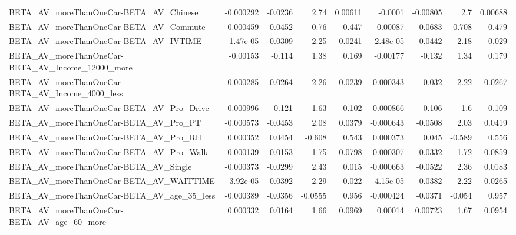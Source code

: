 \begin{tabular}{lrrrrrrrr}
BETA\_AV\_moreThanOneCar-BETA\_AV\_Chinese             &   -0.000292 &      -0.0236 &      2.74 &  0.00611 &    -0.0001 &    -0.00805 &          2.7 &       0.00688 \\
BETA\_AV\_moreThanOneCar-BETA\_AV\_Commute             &   -0.000459 &      -0.0452 &     -0.76 &    0.447 &   -0.00087 &     -0.0683 &       -0.708 &         0.479 \\
BETA\_AV\_moreThanOneCar-BETA\_AV\_IVTIME              &   -1.47e-05 &      -0.0309 &      2.25 &   0.0241 &  -2.48e-05 &     -0.0442 &         2.18 &         0.029 \\
BETA\_AV\_moreThanOneCar-BETA\_AV\_Income\_12000\_more   &    -0.00153 &       -0.114 &      1.38 &    0.169 &   -0.00177 &      -0.132 &         1.34 &         0.179 \\
BETA\_AV\_moreThanOneCar-BETA\_AV\_Income\_4000\_less    &    0.000285 &       0.0264 &      2.26 &   0.0239 &   0.000343 &       0.032 &         2.22 &        0.0267 \\
BETA\_AV\_moreThanOneCar-BETA\_AV\_Pro\_Drive           &   -0.000996 &       -0.121 &      1.63 &    0.102 &  -0.000866 &      -0.106 &          1.6 &         0.109 \\
BETA\_AV\_moreThanOneCar-BETA\_AV\_Pro\_PT              &   -0.000573 &      -0.0453 &      2.08 &   0.0379 &  -0.000643 &     -0.0508 &         2.03 &        0.0419 \\
BETA\_AV\_moreThanOneCar-BETA\_AV\_Pro\_RH              &    0.000352 &       0.0454 &    -0.608 &    0.543 &   0.000373 &       0.045 &       -0.589 &         0.556 \\
BETA\_AV\_moreThanOneCar-BETA\_AV\_Pro\_Walk            &    0.000139 &       0.0153 &      1.75 &   0.0798 &   0.000307 &      0.0332 &         1.72 &        0.0859 \\
BETA\_AV\_moreThanOneCar-BETA\_AV\_Single              &   -0.000373 &      -0.0299 &      2.43 &    0.015 &  -0.000663 &     -0.0522 &         2.36 &        0.0183 \\
BETA\_AV\_moreThanOneCar-BETA\_AV\_WAITTIME            &   -3.92e-05 &      -0.0392 &      2.29 &    0.022 &  -4.15e-05 &     -0.0382 &         2.22 &        0.0265 \\
BETA\_AV\_moreThanOneCar-BETA\_AV\_age\_35\_less         &   -0.000389 &      -0.0356 &   -0.0555 &    0.956 &  -0.000424 &     -0.0371 &       -0.054 &         0.957 \\
BETA\_AV\_moreThanOneCar-BETA\_AV\_age\_60\_more         &    0.000332 &       0.0164 &      1.66 &   0.0969 &    0.00014 &     0.00723 &         1.67 &        0.0954 \\

\end{tabular}
